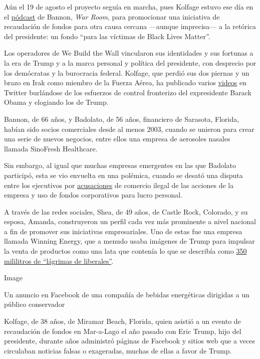 Aún el 19 de agosto el proyecto seguía en marcha, pues Kolfage estuvo
ese día en el
\href{https://pandemic.warroom.org/2020/08/19/ep-342-pandemic-the-unraveling-of-america-w-brian-kolfage-brandon-judd-the-embed-and-wade-davis/}{pódcast}
de Bannon, \emph{War Room}, para promocionar una iniciativa de
recaudación de fondos para otra causa cercana ---aunque imprecisa--- a
la retórica del presidente: un fondo ``para las víctimas de Black Lives
Matter''.

Los operadores de We Build the Wall vincularon sus identidades y sus
fortunas a la era de Trump y a la marca personal y política del
presidente, con desprecio por los demócratas y la burocracia federal.
Kolfage, que perdió sus dos piernas y un brazo en Irak como miembro de
la Fuerza Aérea, ha publicado varios
\href{https://twitter.com/BrianKolfage/status/1167114949476388865}{videos}
en Twitter burlándose de los esfuerzos de control fronterizo del
expresidente Barack Obama y elogiando los de Trump.

Bannon, de 66 años, y Badolato, de 56 años, financiero de Sarasota,
Florida, habían sido socios comerciales desde al menos 2003, cuando se
unieron para crear una serie de nuevos negocios, entre ellos una empresa
de aerosoles nasales llamada SinoFresh Healthcare.

Sin embargo, al igual que muchas empresas emergentes en las que Badolato
participó, esta se vio envuelta en una polémica, cuando se desató una
disputa entre los ejecutivos por
\href{https://www.sec.gov/Archives/edgar/data/1171596/000095014405003324/g94120e10ksb.htm}{acusaciones}
de comercio ilegal de las acciones de la empresa y uso de fondos
corporativos para lucro personal.

A través de las redes sociales, Shea, de 49 años, de Castle Rock,
Colorado, y su esposa, Amanda, construyeron un perfil cada vez más
prominente a nivel nacional a fin de promover sus iniciativas
empresariales. Uno de estas fue una empresa llamada Winning Energy, que
a menudo usaba imágenes de Trump para impulsar la venta de productos
como una lata que contenía lo que se describía como
\href{https://winning-energy.com/}{350 mililitros de ``lágrimas de
liberales''}.

Image

Un anuncio en Facebook de una compañía de bebidas energéticas dirigidas
a un público conservador

Kolfage, de 38 años, de Miramar Beach, Florida, quien asistió a un
evento de recaudación de fondos en Mar-a-Lago el año pasado con Eric
Trump, hijo del presidente, durante años administró páginas de Facebook
y sitios web que a veces circulaban noticias falsas o exageradas, muchas
de ellas a favor de Trump.

